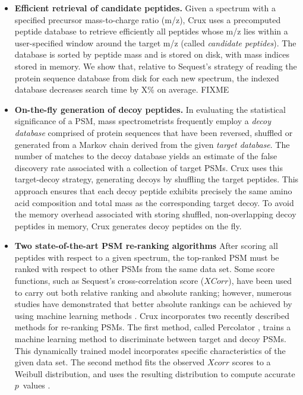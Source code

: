 \documentclass[12pt]{article}
\begin{document}
\begin{itemize}

\item {\bf Efficient retrieval of candidate peptides.}  Given a
  spectrum with a specified precursor mass-to-charge ratio (m/z), Crux
  uses a precomputed peptide database to retrieve efficiently all
  peptides whose m/z lies within a user-specified window around the
  target m/z (called {\em candidate peptides}).  The database is
  sorted by peptide mass and is stored on disk, with mass indices
  stored in memory.  We show that, relative to {\sc Sequest}'s strategy of
  reading the protein sequence database from disk for each new
  spectrum, the indexed database decreases search time by X\% on
  average.
  FIXME

\item {\bf On-the-fly generation of decoy peptides.}  In evaluating
  the statistical significance of a PSM, mass spectrometrists
  frequently employ a {\em decoy database} comprised of protein
  sequences that have been reversed, shuffled or generated from a
  Markov chain derived from the given {\em target database}.  The
  number of matches to the decoy database yields an estimate of the
  false discovery rate associated with a collection of target PSMs.
  Crux uses this target-decoy strategy, generating decoys by shuffling
  the target peptides.  This approach ensures that each decoy peptide
  exhibits precisely the same amino acid composition and total mass as
  the corresponding target decoy.  To avoid the memory overhead
  associated with storing shuffled, non-overlapping decoy peptides in
  memory, Crux generates decoy peptides on the fly.

\item {\bf Two state-of-the-art PSM re-ranking algorithms} After
  scoring all peptides with respect to a given spectrum, the
  top-ranked PSM must be ranked with respect to other PSMs from the
  same data set.  Some score functions, such as {\sc Sequest}'s
  cross-correlation score ($XCorr$), have been used to carry out both
  relative ranking and absolute ranking; however, numerous studies
  have demonstrated that better absolute rankings can be achieved by
  using machine learning methods \cite{keller:empirical, anderson:new,
  elias:intensity, kall:semi-supervised}.  Crux incorporates two
  recently described methods for re-ranking PSMs.  The first method,
  called Percolator \cite{kall:semi-supervised}, trains a machine
  learning method to discriminate between target and decoy PSMs.  This
  dynamically trained model incorporates specific characteristics of
  the given data set.  The second method fits the observed $Xcorr$
  scores to a Weibull distribution, and uses the resulting
  distribution to compute accurate $p$~values \cite{klammer:not}.


\end{itemize}
\end{document}

